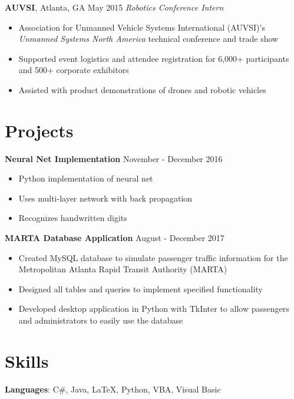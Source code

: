 \documentclass[10pt]{article}
\begin{document}
\vspace{3pt}

\textbf{AUVSI}, Atlanta, GA \hfill May 2015
\linebreak
\textit{Robotics Conference Intern}
\begin{itemize}
    \item Association for Unmanned Vehicle Systems International (AUVSI)'s \emph{Unmanned Systems North America} technical conference and trade show
    \item Supported event logistics and attendee registration for 6,000+ participants and 500+ corporate exhibitors
    \item Assisted with product demonstrations of drones and robotic vehicles
\end{itemize}

\section*{Projects}
\textbf{Neural Net Implementation} \hfill November - December 2016
\begin{itemize}
    \item Python implementation of neural net
    \item Uses multi-layer network with back propagation
    \item Recognizes handwritten digits
\end{itemize}

\vspace{3pt}

\textbf{MARTA Database Application} \hfill August - December 2017
\begin{itemize}
    \item Created MySQL database to simulate passenger traffic information for the Metropolitan Atlanta Rapid Transit Authority (MARTA)
    \item Designed all tables and queries to implement specified functionality
    \item Developed desktop application in Python with TkInter to allow passengers and administrators to easily use the database
\end{itemize}

\section*{Skills}
\textbf{Languages}: C\#, Java, \LaTeX, Python, VBA, Visual Basic

\vspace{3pt}
\end{document}
